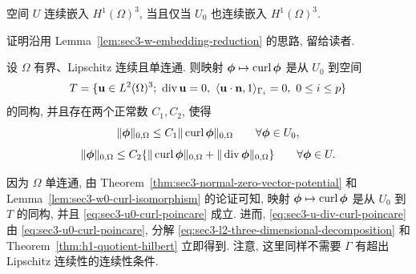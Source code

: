 \setcounter{statement}{4}
\begin{Lemma}\label{lem:sec3-u-embedding-reduction}
空间 $U$ 连续嵌入 $H^1(\Omega)^3$, 当且仅当 $U_0$ 也连续嵌入
$H^1(\Omega)^3$.
\end{Lemma}

证明沿用 Lemma~\ref{lem:sec3-w-embedding-reduction} 的思路, 留给读者.

\setcounter{statement}{5}
\begin{Lemma}\label{lem:sec3-u0-curl-isomorphism}
设 $\Omega$ 有界、Lipschitz 连续且单连通. 则映射
$\boldsymbol\phi\mapsto\operatorname{curl}\boldsymbol\phi$ 是从 $U_0$ 到空间
\[
T=\{\mathbf u\in L^2(\Omega)^3;\ \Div\mathbf u=0,
\ \langle\mathbf u\cdot\mathbf n,1\rangle_{\Gamma_i}=0,
\ 0\le i\le p\}
\]
的同构, 并且存在两个正常数 $C_1,C_2$, 使得
\begin{equation}\label{eq:sec3-u0-curl-poincare}
\|\boldsymbol\phi\|_{0,\Omega}
\le C_1\|\operatorname{curl}\boldsymbol\phi\|_{0,\Omega}
\qquad\forall\boldsymbol\phi\in U_0,
\end{equation}
\begin{equation}\label{eq:sec3-u-div-curl-poincare}
\|\boldsymbol\phi\|_{0,\Omega}
\le C_2\{\|\operatorname{curl}\boldsymbol\phi\|_{0,\Omega}
+\|\operatorname{div}\boldsymbol\phi\|_{0,\Omega}\}
\qquad\forall\boldsymbol\phi\in U.
\end{equation}
\end{Lemma}
\begin{Proof}
因为 $\Omega$ 单连通, 由 Theorem~\ref{thm:sec3-normal-zero-vector-potential}
和 Lemma~\ref{lem:sec3-w0-curl-isomorphism} 的论证可知, 映射
$\boldsymbol\phi\mapsto\operatorname{curl}\boldsymbol\phi$ 是从 $U_0$ 到 $T$ 的同构,
并且 \eqref{eq:sec3-u0-curl-poincare} 成立. 进而,
\eqref{eq:sec3-u-div-curl-poincare} 由
\eqref{eq:sec3-u0-curl-poincare}, 分解
\eqref{eq:sec3-l2-three-dimensional-decomposition} 和
Theorem~\ref{thm:h1-quotient-hilbert} 立即得到.
注意, 这里同样不需要 $\Gamma$ 有超出 Lipschitz 连续性的连续性条件.
\end{Proof}

